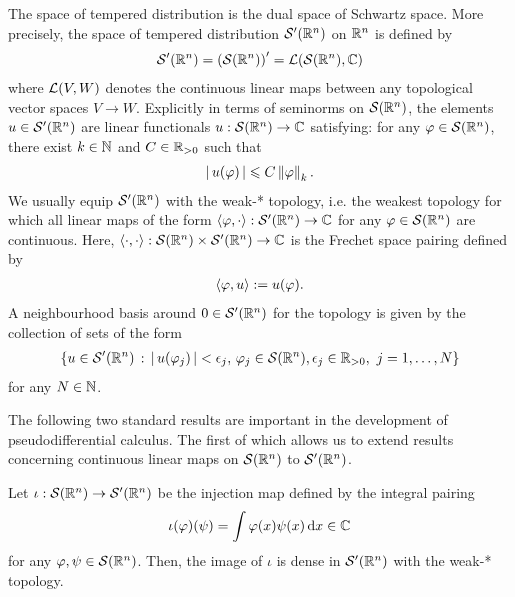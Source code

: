 \documentclass[12pt]{article}
\begin{document}
\begin{fdefinition}
    The space of tempered distribution is the dual space of Schwartz space. More precisely, the space of tempered distribution $\sch'(\R^n)$ on $\R^n$ is defined by 
    \begin{align*}
    \sch'(\R^n) = \brac{\sch(\R^n)}' = \L(\sch(\R^n),\C)
    \end{align*}
    where $\L(V, W)$ denotes the continuous linear maps between any topological vector spaces $V \to W$. Explicitly in terms of seminorms on $\sch(\R^n)$, the elements $u \in \sch'(\R^n)$ are linear functionals $u : \sch(\R^n) \to \C$ satisfying: for any $\varphi \in \sch(\R^n)$, there exist $k \in \N$ and $C \in \R_{> 0}$ such that 
    \begin{align*}
    \abs{u(\varphi)} \leq C \norm[\varphi]_k. 
    \end{align*}
    We usually equip $\sch'(\R^n)$ with the weak-* topology, i.e. the weakest topology for which all linear maps of the form $\inprod[\varphi, \cdot] : \sch'(\R^n) \to \C$ for any $\varphi \in \sch(\R^n)$ are continuous. Here,  $\inprod : \sch(\R^n) \times \sch'(\R^n) \to \C$ is the Frechet space pairing defined by
    \begin{align*}
    \inprod[\varphi, u] := u(\varphi). 
    \end{align*}
    A neighbourhood basis around $0 \in \sch'(\R^n)$ for the topology is given by the collection of sets of the form
    \begin{align*}
    \set{u \in \sch'(\R^n) \wh \abs{u(\varphi_j)} < \epsilon_j, \, \varphi_j \in \sch(\R^n), \epsilon_j \in \R_{> 0}, \, \, j = 1, \dots, N}
    \end{align*}
    for any $N \in \N$. 
\end{fdefinition}

The following two standard results are important in the development of pseudodifferential calculus. The first of which allows us to extend results concerning continuous linear maps on $\sch(\R^n)$ to $\sch'(\R^n)$. 
\begin{flemma}
    Let $\iota : \sch(\R^n) \to \sch'(\R^n)$ be the injection map defined by the integral pairing 
    \begin{align*}
    \iota(\varphi)(\psi) = \int \varphi(x) \psi(x) \d[x] \in \C
    \end{align*}
    for any $\varphi, \psi \in \sch(\R^n)$. Then, the image of $\iota$ is dense in $\sch'(\R^n)$ with the weak-* topology. 
\end{flemma}    
\end{document}
